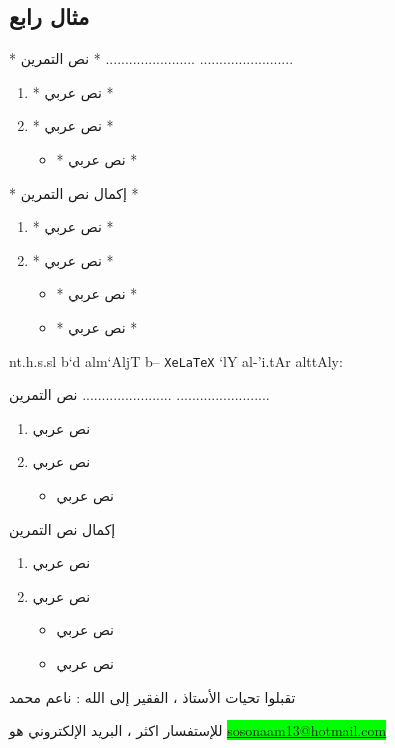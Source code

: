 \documentclass[8pt,a4paper]{article}
\begin{document}
\subsection*{مثال رابع}
\begin{arab}
\begin{boxlis}
\begin{nabox}[style=tamryn]
*\textarabic{\bantii
نص التمرين   }*
.......................
........................
\begin{enumerate}
\item *\textarabic{\bantii
نص عربي }*
\item *\textarabic{\bantii
نص عربي }*
\begin{itemize}
\item *\textarabic{\bantii
نص عربي }*
\end{itemize}
\end{enumerate}
\breakbox
*\textarabic{\bantii
إكمال نص التمرين  }*
\begin{enumerate}
\item *\textarabic{\bantii
نص عربي }*
\item *\textarabic{\bantii
نص عربي }*
\begin{itemize}
\item *\textarabic{\bantii
نص عربي }*
\item *\textarabic{\bantii
نص عربي }*
\end{itemize}
\end{enumerate}
\end{nabox}
\end{boxlis}
nt.h.s.sl b`d alm`AljT b-- \texttt{XeLaTeX}
`lY al-'i.tAr alttAly:
\end{arab}
\begin{nabox}[style=tamryn]
نص التمرين 
.......................
........................
\begin{enumerate}
\item 
نص عربي 
\item 
نص عربي 
\begin{itemize}
\item 
نص عربي 
\end{itemize}
\end{enumerate}
\breakbox
إكمال نص التمرين 
\begin{enumerate}
\item 
نص عربي 
\item 
نص عربي 
\begin{itemize}
\item 
نص عربي 
\item 
نص عربي 
\end{itemize}
\end{enumerate}
\end{nabox}
\vspace{5cm}
\begin{reflet}{ \textarabic{تقبلوا تحيات الأستاذ ، الفقير إلى الله  : ناعم محمد}}
\end{reflet}
للإستفسار اكثر ، البريد الإلكتروني هو
\colorbox{lime}{\url{sosonaam13@hotmail.com}}
\end{document}
